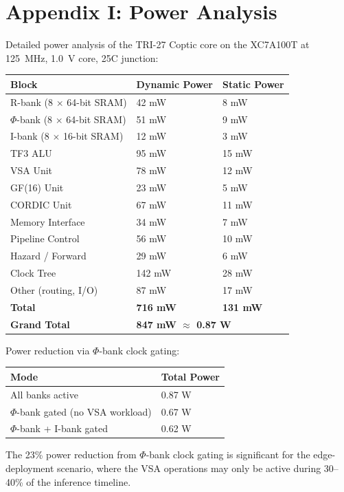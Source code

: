 \section{Appendix I: Power Analysis}\label{fa_71:appx-power}

Detailed power analysis of the TRI-27 Coptic core on the
XC7A100T at 125~MHz, 1.0~V core, 25\textdegree{}C junction:

\begin{longtable}[]{@{}lll@{}}
\toprule\noalign{}
Block & Dynamic Power & Static Power \\
\midrule\noalign{}
\endhead
\bottomrule\noalign{}
\endlastfoot
R-bank (8 $\times$ 64-bit SRAM) & 42 mW & 8 mW \\
$\Phi$-bank (8 $\times$ 64-bit SRAM) & 51 mW & 9 mW \\
I-bank (8 $\times$ 16-bit SRAM) & 12 mW & 3 mW \\
TF3 ALU & 95 mW & 15 mW \\
VSA Unit & 78 mW & 12 mW \\
GF(16) Unit & 23 mW & 5 mW \\
CORDIC Unit & 67 mW & 11 mW \\
Memory Interface & 34 mW & 7 mW \\
Pipeline Control & 56 mW & 10 mW \\
Hazard / Forward & 29 mW & 6 mW \\
Clock Tree & 142 mW & 28 mW \\
Other (routing, I/O) & 87 mW & 17 mW \\
\midrule\noalign{}
\textbf{Total} & \textbf{716 mW} & \textbf{131 mW} \\
\textbf{Grand Total} & \multicolumn{2}{l}{\textbf{847 mW $\approx$ 0.87 W}} \\
\end{longtable}

Power reduction via $\Phi$-bank clock gating:

\begin{longtable}[]{@{}ll@{}}
\toprule\noalign{}
Mode & Total Power \\
\midrule\noalign{}
\endhead
\bottomrule\noalign{}
\endlastfoot
All banks active & 0.87 W \\
$\Phi$-bank gated (no VSA workload) & 0.67 W \\
$\Phi$-bank + I-bank gated & 0.62 W \\
\end{longtable}

The 23\% power reduction from $\Phi$-bank clock gating is
significant for the edge-deployment scenario, where the VSA
operations may only be active during 30--40\% of the inference
timeline.

